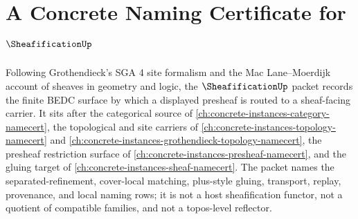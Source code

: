 \chapter{A Concrete Naming Certificate for $\SheafificationUp$}
\label{ch:concrete-instances-sheafification-namecert}

Following Grothendieck's SGA 4 site formalism and the Mac Lane--Moerdijk account of sheaves in geometry and logic, the $\SheafificationUp$ packet records the finite BEDC surface by which a displayed presheaf is routed to a sheaf-facing carrier. It sits after the categorical source of \autoref{ch:concrete-instances-category-namecert}, the topological and site carriers of \autoref{ch:concrete-instances-topology-namecert} and \autoref{ch:concrete-instances-grothendieck-topology-namecert}, the presheaf restriction surface of \autoref{ch:concrete-instances-presheaf-namecert}, and the gluing target of \autoref{ch:concrete-instances-sheaf-namecert}. The packet names the separated-refinement, cover-local matching, plus-style gluing, transport, replay, provenance, and local naming rows; it is not a host sheafification functor, not a quotient of compatible families, and not a topos-level reflector.

